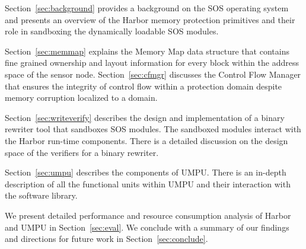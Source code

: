 Section~\ref{sec:background} provides a background on the SOS
operating system and presents an overview of the Harbor memory
protection primitives and their role in
sandboxing the dynamically loadable SOS modules.

Section~\ref{sec:memmap} explains the Memory Map data structure that
contains fine grained ownership and layout information for every block
within the address space of the sensor node. 
%
Section~\ref{sec:cfmgr} discusses the Control Flow Manager that
ensures the integrity of control flow within a protection domain
despite memory corruption localized to a domain.

Section~\ref{sec:writeverify} describes the design and implementation
of a binary rewriter tool that sandboxes SOS modules.
%
The sandboxed modules interact with the Harbor run-time components.
%
There is a detailed discussion on the design space of the verifiers
for a binary rewriter.

Section~\ref{sec:umpu} describes the components of UMPU.
%
There is an in-depth 
description of all the functional units
within UMPU and their interaction with the software library.

We present detailed performance and resource consumption analysis of
Harbor and UMPU in Section~\ref{sec:eval}.
%
We conclude with a summary of our findings and directions for future
work in Section~\ref{sec:conclude}.
